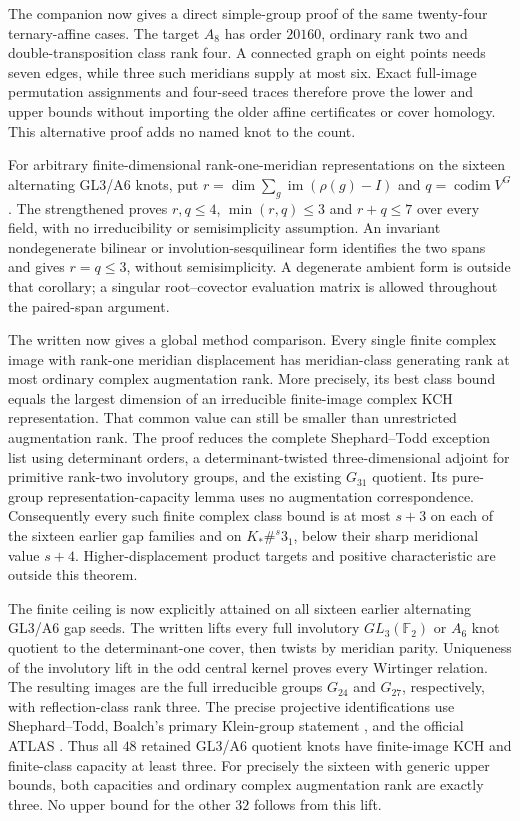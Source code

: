 \documentclass[11pt]{article}
\begin{document}
The companion  now gives a direct simple-group
proof of the same twenty-four ternary-affine cases. The target $A_8$
has order $20160$, ordinary rank two and double-transposition class
rank four. A connected graph on eight points needs seven edges, while
three such meridians supply at most six. Exact full-image permutation
assignments and four-seed traces therefore prove the lower and upper
bounds without importing the older affine certificates or cover homology.
This alternative proof adds no named knot to the count.

For arbitrary finite-dimensional rank-one-meridian representations on
the sixteen alternating GL3/A6 knots, put $r=\dim\sum_g\operatorname{im}
(\rho(g)-I)$ and $q=\operatorname{codim}V^G$.
The strengthened  proves
$r,q\le4$, $\min(r,q)\le3$ and $r+q\le7$ over every field, with no
irreducibility or semisimplicity assumption. An invariant nondegenerate
bilinear or involution-sesquilinear form identifies the two spans and
gives $r=q\le3$, without semisimplicity. A degenerate ambient form is
outside that corollary; a singular root--covector evaluation matrix
is allowed throughout the paired-span argument.

The written 
now gives a global method comparison. Every single finite complex image
with rank-one meridian displacement has meridian-class generating rank
at most ordinary complex augmentation rank. More precisely, its best
class bound equals the largest dimension of an irreducible finite-image
complex KCH representation. That common value can still be smaller
than unrestricted augmentation rank.
The proof reduces the complete Shephard--Todd exception list \cite{st54}
using determinant orders, a determinant-twisted three-dimensional
adjoint for primitive rank-two involutory groups, and the existing
$G_{31}$ quotient. Its pure-group representation-capacity lemma uses
no augmentation correspondence. Consequently every such finite complex
class bound is at most $s+3$ on each of the sixteen earlier gap families
and on $K_*\#^s3_1$, below their sharp meridional value $s+4$.
Higher-displacement product targets and positive characteristic are
outside this theorem.

The finite ceiling is now explicitly attained on all sixteen earlier
alternating GL3/A6 gap seeds. The written
 lifts every full involutory
$GL_3(\mathbb F_2)$ or $A_6$ knot quotient to the determinant-one
cover, then twists by meridian parity. Uniqueness of the involutory
lift in the odd central kernel proves every Wirtinger relation.
The resulting images are the full irreducible groups $G_{24}$ and
$G_{27}$, respectively, with reflection-class rank three.
The precise projective identifications use Shephard--Todd,
Boalch's primary Klein-group statement \cite{boalch04}, and the official
ATLAS \cite{atlasgl}. Thus all $48$ retained GL3/A6 quotient knots
have finite-image KCH and finite-class capacity at least three.
For precisely the sixteen with generic upper bounds, both capacities
and ordinary complex augmentation rank are exactly three. No upper
bound for the other $32$ follows from this lift.
\end{document}
